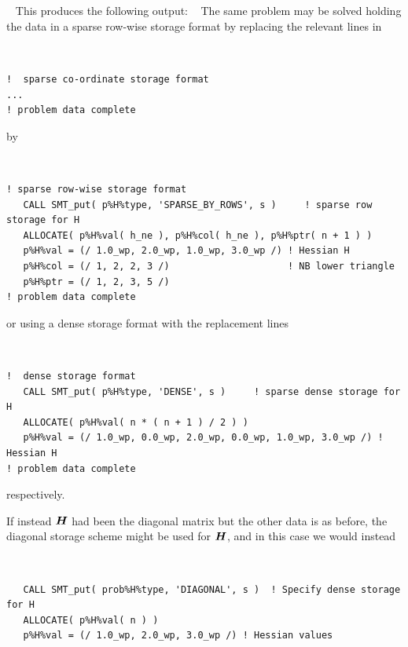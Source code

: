 \documentclass{galahad}
\begin{document}
{\tt \small
\VerbatimInput{\packageexample}
}
\noindent
This produces the following output:
{\tt \small
\VerbatimInput{\packageresults}
}
\noindent
The same problem may be solved holding the data in
a sparse row-wise storage format by replacing the relevant lines in
{\tt \small
\begin{verbatim}
!  sparse co-ordinate storage format
...
! problem data complete
\end{verbatim}
}
\noindent
by
{\tt \small
\begin{verbatim}
! sparse row-wise storage format
   CALL SMT_put( p%H%type, 'SPARSE_BY_ROWS', s )     ! sparse row storage for H
   ALLOCATE( p%H%val( h_ne ), p%H%col( h_ne ), p%H%ptr( n + 1 ) )
   p%H%val = (/ 1.0_wp, 2.0_wp, 1.0_wp, 3.0_wp /) ! Hessian H
   p%H%col = (/ 1, 2, 2, 3 /)                     ! NB lower triangle
   p%H%ptr = (/ 1, 2, 3, 5 /)
! problem data complete
\end{verbatim}
}
\noindent
or using a dense storage format with the replacement lines
{\tt \small
\begin{verbatim}
!  dense storage format
   CALL SMT_put( p%H%type, 'DENSE', s )     ! sparse dense storage for H
   ALLOCATE( p%H%val( n * ( n + 1 ) / 2 ) )
   p%H%val = (/ 1.0_wp, 0.0_wp, 2.0_wp, 0.0_wp, 1.0_wp, 3.0_wp /) ! Hessian H
! problem data complete
\end{verbatim}
}
\noindent
respectively.

If instead ${\bm{H}}$ had been the diagonal matrix
but the other data is as before, the diagonal storage scheme
might be used for ${\bm{H}}$, and in this case we would instead
{\tt \small
\begin{verbatim}
   CALL SMT_put( prob%H%type, 'DIAGONAL', s )  ! Specify dense storage for H
   ALLOCATE( p%H%val( n ) )
   p%H%val = (/ 1.0_wp, 2.0_wp, 3.0_wp /) ! Hessian values
\end{verbatim}
}
\noindent
\end{document}
